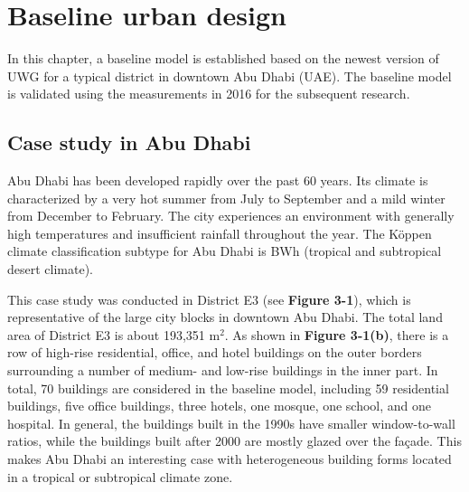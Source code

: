\chapter{Baseline urban design}

%

In this chapter, a baseline model is established based on the newest version of UWG for a typical district in downtown Abu Dhabi (UAE). The baseline model is validated using the measurements in 2016 for the subsequent research.

\section{Case study in Abu Dhabi}

Abu Dhabi has been developed rapidly over the past 60 years. Its climate is characterized by a very hot summer from July to September and a mild winter from December to February. The city experiences an environment with generally high temperatures and insufficient rainfall throughout the year. The K\"{o}ppen climate classification subtype for Abu Dhabi is BWh (tropical and subtropical desert climate).

This case study was conducted in District E3 (see \textbf{Figure 3-1}), which is representative of the large city blocks in downtown Abu Dhabi. The total land area of District E3 is about 193,351 m$^2$. As shown in \textbf{Figure 3-1(b)}, there is a row of high-rise residential, office, and hotel buildings on the outer borders surrounding a number of medium- and low-rise buildings in the inner part. In total, 70 buildings are considered in the baseline model, including 59 residential buildings, five office buildings, three hotels, one mosque, one school, and one hospital. In general, the buildings built in the 1990s have smaller window-to-wall ratios, while the buildings built after 2000 are mostly glazed over the fa\c{c}ade. This makes Abu Dhabi an interesting case with heterogeneous building forms located in a tropical or subtropical climate zone.

